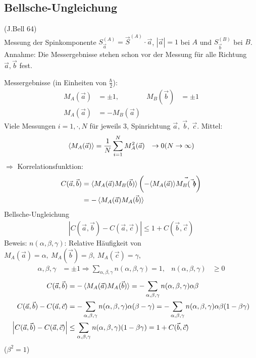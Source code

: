 \subsection{Bellsche-Ungleichung} (J.Bell 64)
	\\
	Messung der Spinkomponente $S_{\vec{a}}^{(A)} = \vec{S}^{(A)} \cdot \vec{a}$, $|\vec{a}| = 1$ bei $A$ und $S_{\vec{b}}^{(B)}$ bei $B$.
	\\
	Annahme: Die Messergebnisse stehen schon vor der Messung für alle Richtung $\vec{a}, \vec{b}$ fest.

	Messergebnisse (in Einheiten von $\frac{\hbar}{2}$):
		\begin{align*}
			M_A(\vec{a}) &= \pm 1 ,& M_B(\vec{b}) &= \pm 1 \\
			M_A(\vec{a}) &= -M_B (\vec{a})
		\end{align*}
	Viele Messungen $i= 1, \cdot, N$ für jeweils 3, Spinrichtung $\vec{a},~\vec{b},~ \vec{c}$. Mittel: 
		\begin{align*}
			\langle {M_A(\vec{a})} \rangle &= \frac{1}{N} \sum_{i = 1}^{N} M_A^2(\vec{a})
			&\rightarrow 0 (N \rightarrow \infty)
		\end{align*}
	$\Rightarrow$ Korrelationsfunktion:
		\begin{align*}
			C(\vec{a}, \vec{b}) &=
			\braket{M_A(\vec{a}) M_B(\vec{b})} \left(- \langle {M_A(\vec{a})} \rangle \vec{M_B(\vec{b})}\right) \\
			&= - \braket{M_A(\vec{a}) M_A(\vec{b})}
		\end{align*}
	Bellsche-Ungleichung
		\begin{align*}
		\left|C(\vec{a}, \vec{b}) - C(\vec{a}, \vec{c})\right| \leq 1 + C(\vec{b}, \vec{c})
		\end{align*}
	Beweis: $n(\alpha, \beta, \gamma)$: Relative Häufigkeit von $M_A(\vec{a}) = \alpha,~ M_A(\vec{b}) = \beta,~ M_A(\vec{c}) = \gamma$,
		\begin{align*}
			\alpha, \beta, \gamma &= \pm 1 
			\Rightarrow \sum_{\alpha, \beta, \gamma} n(\alpha, \beta, \gamma) = 1,&
			n(\alpha, \beta, \gamma) &\geq 0 
		\end{align*}
		\begin{align*}
			C(\vec{a}, \vec{b}) &= - \braket{M_A(\vec{a}) M_A(\vec{b})} = 
			- \sum_{\alpha, \beta, \gamma} n(\alpha, \beta, \gamma) \alpha \beta \\
			C(\vec{a}, \vec{b}) - C(\vec{a}, \vec{c}) &=
			- \sum_{\alpha, \beta, \gamma} n(\alpha, \beta, \gamma) \alpha(\beta - \gamma)
			= - \sum_{\alpha, \beta, \gamma} n(\alpha, \beta, \gamma) \alpha \beta (1 - \beta \gamma) \\
			\left|C(\vec{a}, \vec{b}) - C(\vec{a}, \vec{c})\right| &\leq 
			\sum_{\alpha, \beta, \gamma} n(\alpha, \beta, \gamma) (1 - \beta \gamma) = 
			1 + C(\vec{b}, \vec{c})
		\end{align*} ($\beta^2 = 1$)
		
